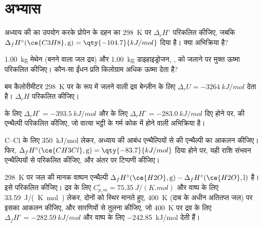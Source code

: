 \section{अभ्यास}

\begin{exercise}[$\star$]\label{exo:b2:reaction-enthalpy:1}
अध्याय की  का उपयोग करके प्रोपेन के दहन
 का \qty{298}{K} पर
$\Delta_r H^\circ$ परिकलित कीजिए, जबकि $\Delta_f
H^\circ(\ce{C3H8}, \text{g}) = \qty{-104.7}{kJ/mol}$ दिया है। क्या अभिक्रिया
 है?
\end{exercise}

\begin{exercise}[$\star$]\label{exo:b2:reaction-enthalpy:2}
\qty{1.00}{kg} मेथेन (बनने वाला जल द्रव) और \qty{1.00}{kg} डाइहाइड्रोजन,
, को जलाने पर मुक्त ऊष्मा परिकलित कीजिए। कौन-सा ईंधन प्रति किलोग्राम अधिक ऊष्मा देता है?
\end{exercise}

\begin{exercise}[$\star$]\label{exo:b2:reaction-enthalpy:3}
बम कैलोरीमीटर \qty{298}{K} पर 
के रूप में जलने वाली द्रव बेन्ज़ीन के लिए $\Delta_r U = \qty{-3264}{kJ/mol}$
देता है। $\Delta_r H$ परिकलित कीजिए।
\end{exercise}

\begin{exercise}[$\star$]\label{exo:b2:reaction-enthalpy:4}
 के लिए $\Delta_r H^\circ = \qty{-393.5}{kJ/mol}$ और  के लिए $\Delta_r H^\circ = \qty{-283.0}{kJ/mol}$ दिए होने पर,  की एन्थैल्पी परिकलित कीजिए,
जो वात्या भट्ठी के गर्म कोक में होने वाली अभिक्रिया है।
\end{exercise}

\begin{exercise}[$\star\star$]\label{exo:b2:reaction-enthalpy:5}
C--Cl के लिए \qty{350}{kJ/mol} लेकर, अध्याय की आबंध एन्थैल्पियों से
 की एन्थैल्पी का आकलन कीजिए।
फिर, $\Delta_f H^\circ(\ce{CH3Cl}, \text{g}) = \qty{-83.7}{kJ/mol}$ दिया होने पर,
यही राशि संभवन एन्थैल्पियों से परिकलित कीजिए, और अंतर पर
टिप्पणी कीजिए।
\end{exercise}

\begin{exercise}[$\star\star$]\label{exo:b2:reaction-enthalpy:6}
\qty{298}{K} पर जल की मानक वाष्पन एन्थैल्पी
$\Delta_f H^\circ(\ce{H2O}, \text{g}) - \Delta_f H^\circ(\ce{H2O},
\text{l})$ है। इसे परिकलित कीजिए। द्रव के लिए $C_{p,m}^\circ = \qty{75.35}{J/(K.mol)}$ और
वाष्प के लिए \qty{33.59}{J/(K.mol)} लेकर, दोनों को स्थिर मानते हुए,
\qty{400}{K} (दाब के अधीन अतितप्त जल) पर इसका आकलन कीजिए,
और सारणियों से तुलना कीजिए, जो \qty{400}{K} पर द्रव के लिए $\Delta_f H^\circ =
\qty{-282.59}{kJ/mol}$ और वाष्प के लिए \qty{-242.85}{kJ/mol}
देती हैं।
\end{exercise}

